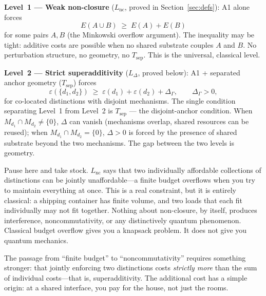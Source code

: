 \documentclass[11pt]{article}
\theoremstyle{remark}
\begin{document}
\textbf{Level~1 --- Weak non-closure} ($L_{\mathrm{nc}}$, proved in Section~\ref{sec:defs}): A1 alone forces
\[
E(A \cup B) \;\ge\; E(A) + E(B)
\]
for some pairs $A, B$ (the Minkowski overflow argument).  The inequality may be tight: additive costs are possible when no shared substrate couples $A$ and $B$.  No perturbation structure, no geometry, no $T_{\mathrm{sep}}$.  This is the universal, classical level.

\textbf{Level~2 --- Strict superadditivity} ($L_\Delta$, proved below): A1 + separated anchor geometry ($T_{\mathrm{sep}}$) forces
\[
\varepsilon(\{d_1,d_2\}) \;\ge\; \varepsilon(d_1) + \varepsilon(d_2) + \Delta_\Gamma, \qquad \Delta_\Gamma > 0,
\]
for co-located distinctions with disjoint mechanisms.  The single condition separating Level~1 from Level~2 is $T_{\mathrm{sep}}$ --- the disjoint-anchor condition.  When $M_{d_1} \cap M_{d_2} \ne \{0\}$, $\Delta$ can vanish (mechanisms overlap, shared resources can be reused); when $M_{d_1} \cap M_{d_2} = \{0\}$, $\Delta > 0$ is forced by the presence of shared substrate beyond the two mechanisms.  The gap between the two levels is geometry.

Pause here and take stock.  $L_{\mathrm{nc}}$ says that two individually affordable collections of distinctions can be jointly unaffordable---a finite budget overflows when you try to maintain everything at once.  This is a real constraint, but it is entirely classical: a shipping container has finite volume, and two loads that each fit individually may not fit together.  Nothing about non-closure, by itself, produces interference, noncommutativity, or any distinctively quantum phenomenon.  Classical budget overflow gives you a knapsack problem.  It does not give you quantum mechanics.

The passage from ``finite budget'' to ``noncommutativity'' requires something stronger: that jointly enforcing two distinctions costs \emph{strictly more} than the sum of individual costs---that is, superadditivity.  The additional cost has a simple origin: at a shared interface, you pay for the house, not just the rooms.
\end{document}
